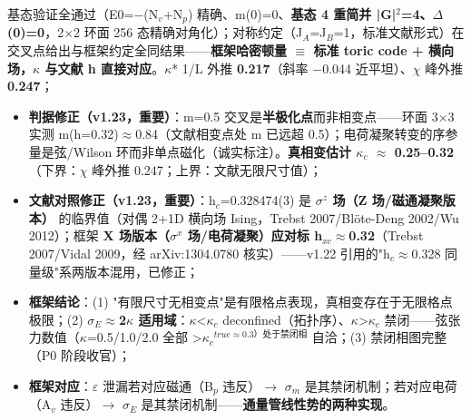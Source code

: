 \documentclass[UTF8,fontset=windows]{csoarticle}
\newcommand{\up}[1]{\ensuremath{^{#1}}}
\newcommand{\down}[1]{\ensuremath{_{#1}}}
\begin{document}
    基态验证全通过（E0=\ensuremath{-}(N\down{v}+N\down{p}) 精确、m(0)=0、\textbf{基态 4 重简并 |G|\up{2}=4、\ensuremath{\Delta}(0)=0}，2\ensuremath{\times}2 环面 256 态精确对角化）；对称约定（J\down{A}=J\down{B}=1，标准文献形式）在交叉点给出与框架约定全同结果------\textbf{框架哈密顿量 \ensuremath{\equiv} 标准 toric code + 横向场，\ensuremath{\kappa} 与文献 h 直接对应}。\ensuremath{\kappa}* 1/L 外推 \textbf{0.217}（斜率 \ensuremath{-}0.044 近平坦）、\ensuremath{\chi} 峰外推 \textbf{0.247}；
\begin{itemize}
\item \textbf{判据修正（v1.23，重要）}：m=0.5 交叉是\textbf{半极化点}而非相变点------环面 3\ensuremath{\times}3 实测 m(h=0.32)\ensuremath{\approx}0.84（文献相变点处 m 已远超 0.5）；电荷凝聚转变的序参量是弦/Wilson 环而非单点磁化（诚实标注）。\textbf{真相变估计 \ensuremath{\kappa}\down{c} \ensuremath{\approx} 0.25--0.32}（下界：\ensuremath{\chi} 峰外推 0.247；上界：文献无限尺寸值）；
\item \textbf{文献对照修正（v1.23，重要）}：h\down{c}=0.328474(3) 是 \textbf{\ensuremath{\sigma}\up{z} 场（Z 场/磁通凝聚版本）} 的临界值（对偶 2+1D 横向场 Ising，Trebst 2007/Bl\"{o}te-Deng 2002/Wu 2012）；框架 \textbf{X 场版本（\ensuremath{\sigma}\up{x} 场/电荷凝聚）应对标 h\down{xc}\ensuremath{\approx}0.32}（Trebst 2007/Vidal 2009，经 arXiv:1304.0780 核实）------v1.22 引用的"h\down{c}\ensuremath{\approx}0.328 同量级"系两版本混用，已修正；
\item \textbf{框架结论}：(1) "有限尺寸无相变点"是有限格点表现，真相变存在于无限格点极限；(2) \textbf{\ensuremath{\sigma}\down{E}\ensuremath{\approx}2\ensuremath{\kappa} 适用域}：\ensuremath{\kappa}<\ensuremath{\kappa}\down{c} deconfined（拓扑序）、\ensuremath{\kappa}>\ensuremath{\kappa}\down{c} 禁闭------弦张力数值（\ensuremath{\kappa}=0.5/1.0/2.0 全部 >\ensuremath{\kappa}\down{c}\up{true\approx{}0.3）处于禁闭相} \checkmark 自洽；(3) 禁闭相图完整（P0 阶段收官）；
\end{itemize}
\begin{itemize}
\item \textbf{框架对应}：\ensuremath{\varepsilon} 泄漏若对应磁通（B\down{p} 违反）\ensuremath{\to} \ensuremath{\sigma}\down{m} 是其禁闭机制；若对应电荷（A\down{v} 违反）\ensuremath{\to} \ensuremath{\sigma}\down{E} 是其禁闭机制------\textbf{通量管线性势的两种实现}。
\end{itemize}
\end{document}
